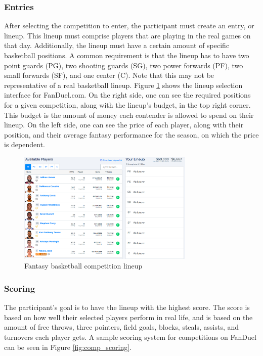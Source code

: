 \subsubsection{Entries}
After selecting the competition to enter, the participant must create an entry, or lineup. This lineup must comprise players that are playing in the real games on that day. Additionally, the lineup must have a certain amount of specific basketball positions. A common requirement is that the lineup has to have two point guards (PG), two shooting guards (SG), two power forwards (PF), two small forwards (SF), and one center (C). Note that this may not be representative of a real basketball lineup. Figure \ref{fig:comp_lineup} shows the lineup selection interface for FanDuel.com. On the right side, one can see the required positions for a given competition, along with the lineup's budget, in the top right corner. This budget is the amount of money each contender is allowed to spend on their lineup. On the left side, one can see the price of each player, along with their position, and their average fantasy performance for the season, on which the price is dependent.

\begin{figure}[ht]
    \centering
    \includegraphics[width=0.75\textwidth]{figures/fantasy_competition_lineup}
    \caption{Fantasy basketball competition lineup}
    \label{fig:comp_lineup}
\end{figure}

\subsubsection{Scoring}
The participant's goal is to have the lineup with the highest score. The score is based on how well their selected players perform in real life, and is based on the amount of free throws, three pointers, field goals, blocks, steals, assists, and turnovers each player gets. A sample scoring system for competitions on FanDuel can be seen in Figure \ref{fig:comp_scoring}.

